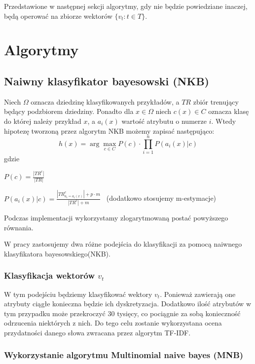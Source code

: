 \documentclass[a4paper,12pt]{article}
\begin{document}
	Przedstawione w następnej sekcji algorytmy, gdy nie
	będzie powiedziane inaczej, będą operować 
	na zbiorze wektorów $\{v_t: t \in T\}$.

\section{Algorytmy}

\subsection{Naiwny klasyfikator bayesowski (NKB)}
	
	Niech $\Omega$ oznacza dziedzinę klasyfikowanych przykładów,
	a $TR$ zbiór trenujący będący podzbiorem dziedziny.
	Ponadto dla $x \in \Omega$ niech
	$c(x) \in C$ oznacza klasę do której należy przykład $x$,
	a $a_i(x)$ wartość atrybutu o numerze $i$.
	Wtedy
	hipotezę tworzoną przez algorytm NKB możemy zapisać 
	następująco:
	\[ h(x) = \arg\max_{c \in C}{
		P(c) \cdot \prod_{i=1}^{n} P(a_i(x)|c)	
	} \]
	gdzie
	\begin{list}{}{}
		\item
			$P(c) = \frac{|TR^c|}{|TR|}$
		\item
			$P(a_i(x)|c) = \frac{|TR_{a_i = a_i(x)}^c| + p\cdot m}{|TR^c| + m}$ \  (dodatkowo stosujemy m-estymacje)
	
	\end{list}
	
	Podczas implementacji wykorzystamy zlogarytmowaną postać 
	powyższego równania.
	
	W pracy zastosujemy dwa różne podejścia do klasyfikacji
	za pomocą naiwnego klasyfikatora bayesowskiego(NKB).
	
	\subsubsection{Klasyfikacja wektorów $v_t$}

		W tym podejściu będziemy klasyfikować wektory $v_t$.
		Ponieważ zawierają one atrybuty ciągłe konieczna będzie 
		ich dyskretyzacja. Dodatkowo ilość atrybutów
		w tym przypadku może przekroczyć 30 tysięcy, 
		co pociągnie za sobą konieczność
		odrzucenia niektórych z nich.
		Do tego celu zostanie wykorzystana ocena przydatności
		danego słowa zwracana przez algorytm TF-IDF.	
	
	\subsubsection{Wykorzystanie algorytmu Multinomial naive bayes (MNB)}
	
\end{document}
